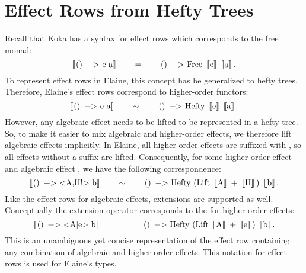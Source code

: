 \section{Effect Rows from Hefty Trees}
\newcommand\BB[1]{\left\llbracket\mcode{#1}\right\rrbracket}

Recall that Koka has a syntax for effect rows which corresponds to the free monad:
\[
  \BB{() -> e a}
  \qquad=\qquad
  \mcode{() -> Free}\ \BB{e}\ \BB{a}.
\]
To represent effect rows in Elaine, this concept has be generalized to hefty trees. Therefore, Elaine's effect rows correspond to higher-order functors:
\[
  \BB{() -> e a}
  \qquad\sim\qquad
  \mcode{() -> Hefty}\ \BB{e}\ \BB{a}.
\]
However, any algebraic effect needs to be lifted to be represented in a hefty tree. So, to make it easier to mix algebraic and higher-order effects, we therefore lift algebraic effects implicitly. In Elaine, all higher-order effects are suffixed with \hs{!}, so all effects without a \el{!} suffix are lifted. Consequently, for some higher-order effect  and algebraic effect , we have the following correspondence:
\[
  \BB{() -> <A,H!> b}
  \qquad\sim\qquad
  \mcode{() -> Hefty (Lift}
    \ \BB{A}
    \ \mcode{+}
    \ \BB{H}
    \mcode{)}
    \ \BB{b}.
\]
Like the effect rows for algebraic effects, extensions are supported as well. Conceptually the extension operator corresponds to the \hs{+} for higher-order effects:
\[
  \BB{() -> <A|e> b}
  \qquad=\qquad
  \mcode{() -> Hefty (Lift}
    \ \BB{A}
    \ \mcode{+}
    \ \BB{e}\mcode{)}
    \ \BB{b}.
\]
This is an unambiguous yet concise representation of the effect row containing any combination of algebraic and higher-order effects. This notation for effect rows is used for Elaine's types. 

